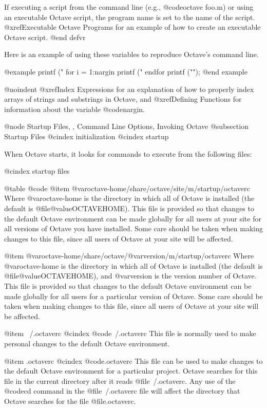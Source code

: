 If executing a script from the command line (e.g., @code{octave foo.m})
or using an executable Octave script, the program name is set to the
name of the script.  @xref{Executable Octave Programs} for an example of
how to create an executable Octave script.
@end defvr

Here is an example of using these variables to reproduce Octave's
command line.

@example
printf ("%
for i = 1:nargin
  printf (" %
endfor
printf ("\n");
@end example

@noindent
@xref{Index Expressions} for an explanation of how to properly index
arrays of strings and substrings in Octave, and @xref{Defining Functions} 
for information about the variable @code{nargin}.

@node Startup Files,  , Command Line Options, Invoking Octave
@subsection Startup Files
@cindex initialization
@cindex startup

When Octave starts, it looks for commands to execute from the following
files:

@cindex startup files

@table @code
@item @var{octave-home}/share/octave/site/m/startup/octaverc
Where @var{octave-home} is the directory in which all of Octave is
installed (the default is @file{@value{OCTAVEHOME}}).  This file is
provided so that changes to the default Octave environment can be made
globally for all users at your site for all versions of Octave you have
installed.  Some care should be taken when making changes to this file,
since all users of Octave at your site will be affected.

@item @var{octave-home}/share/octave/@var{version}/m/startup/octaverc
Where @var{octave-home} is the directory in which all of Octave is
installed (the default is @file{@value{OCTAVEHOME}}), and @var{version}
is the version number of Octave.  This file is provided so that changes
to the default Octave environment can be made globally for all users for
a particular version of Octave.  Some care should be taken when making
changes to this file, since all users of Octave at your site will be
affected.

@item ~/.octaverc
@cindex @code{~/.octaverc}
This file is normally used to make personal changes to the default
Octave environment.

@item .octaverc
@cindex @code{.octaverc}
This file can be used to make changes to the default Octave environment
for a particular project.  Octave searches for this file in the current
directory after it reads @file{~/.octaverc}.  Any use of the @code{cd}
command in the @file{~/.octaverc} file will affect the directory that
Octave searches for the file @file{.octaverc}.

